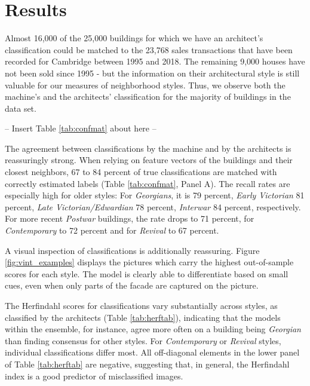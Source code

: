 \documentclass[]{article}
\begin{document}
\hypertarget{results}{%
\section{Results}\label{results}}

Almost 16,000 of the 25,000 buildings for which we have an architect's
classification could be matched to the 23,768 sales transactions that
have been recorded for Cambridge between 1995 and 2018. The remaining
9,000 houses have not been sold since 1995 - but the information on
their architectural style is still valuable for our measures of
neighborhood styles. Thus, we observe both the machine's and the
architects' classification for the majority of buildings in the data
set.

\begin{center}
  -- Insert Table \ref{tab:confmat} about here --
\end{center}

The agreement between classifications by the machine and by the
architects is reassuringly strong. When relying on feature vectors of
the buildings and their closest neighbors, 67 to 84 percent of true
classifications are matched with correctly estimated labels (Table
\ref{tab:confmat}, Panel A). The recall rates are especially high for
older styles: For \emph{Georgians}, it is 79 percent, \emph{Early
Victorian} 81 percent, \emph{Late Victorian/Edwardian} 78 percent,
\emph{Interwar} 84 percent, respectively. For more recent \emph{Postwar}
buildings, the rate drops to 71 percent, for \emph{Contemporary} to 72
percent and for \emph{Revival} to 67 percent.

A visual inspection of classifications is additionally reassuring.
Figure \ref{fig:vint_examples} displays the pictures which carry the
highest out-of-sample scores for each style. The model is clearly able
to differentiate based on small cues, even when only parts of the facade
are captured on the picture.

The Herfindahl scores for classifications vary substantially across
styles, as classified by the architects (Table \ref{tab:herftab}),
indicating that the models within the ensemble, for instance, agree more
often on a building being \emph{Georgian} than finding consensus for
other styles. For \emph{Contemporary} or \emph{Revival} styles,
individual classifications differ most. All off-diagonal elements in the
lower panel of Table \ref{tab:herftab} are negative, suggesting that, in
general, the Herfindahl index is a good predictor of misclassified
images.
\end{document}
